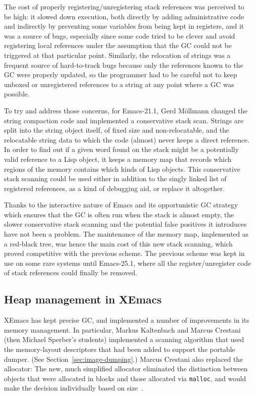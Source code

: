 \documentclass[format=acmsmall, review]{acmart}
\begin{document}
The cost of properly registering/unregistering stack references was
perceived to be high: it slowed down execution, both directly by adding
administrative code and indirectly by preventing some variables from being
kept in registers, and it was a source of bugs, especially since some code
tried to be clever and avoid registering local references under the
assumption that the GC could not be triggered at that particular point.
Similarly, the relocation of strings was a frequent source of hard-to-track
bugs because only the references known to the GC were properly updated, so
the programmer had to be careful not to keep unboxed or unregistered
references to a string at any point where a GC was possible.

To try and address those concerns, for Emacs-21.1, Gerd Möllmann changed the
string compaction code and implemented a conservative stack scan.
Strings are split into the string object itself, of fixed size and
non-relocatable, and the relocatable string data to which the code (almost)
never keeps a direct reference.  In order to find out if a given word found
on the stack might be a potentially valid reference to a Lisp object, it
keeps a memory map that records which regions of the memory contains which
kinds of Lisp objects.  This conservative stack scanning could be used
either in addition to the singly linked list of registered references, as
a kind of debugging aid, or replace it altogether.

Thanks to the interactive nature of Emacs and its opportunistic GC strategy
which ensures that the GC is often run when the stack is almost empty, the
slower conservative stack scanning and the potential false positives it
introduces have not been a problem.  The maintenance of the memory map,
implemented as a red-black tree, was hence the main cost of this new stack
scanning, which proved competitive with the previous scheme.  The previous
scheme was kept in use on some rare systems until Emacs-25.1, where all the
register/unregister code of stack references could finally be removed.

\subsection{Heap management in XEmacs}
\label{sec:heap-xemacs}

XEmacs has kept precise GC, and implemented a number of improvements
in its memory management.  In particular, Markus Kaltenbach and Marcus
Crestani (then Michael Sperber's students)
implemented a scanning algorithm that used the memory-layout
descriptors that had been added to support the portable dumper.  (See
Section~\ref{sec:image-dumping}.)  Marcus Crestani also replaced the
allocator: The new, much simplified allocator eliminated the
distinction between objects that were allocated in blocks and those
allocated via \texttt{malloc}, and would make the decision
individually based on size~\cite{Crestani2005}.
\end{document}
